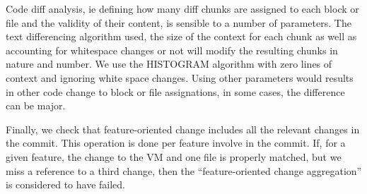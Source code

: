 Code diff analysis, ie defining how many diff chunks are assigned to each block or file and the validity of their content,
is sensible to a number of parameters. The text differencing algorithm used, the size of the context for each chunk as well as 
accounting for whitespace changes or not will modify the resulting chunks in nature and number. 
We use the HISTOGRAM algorithm with zero lines of context and ignoring white space changes. Using other parameters
would results in other code change to block or file assignations, in some cases, the difference can be major.


Finally, we check that feature-oriented change includes all the relevant changes in the commit. This operation is done per feature involve in the commit.
If, for a given feature, the change to the VM and one file is properly matched, but we miss a reference to a third change, then the ``feature-oriented change aggregation'' is considered to have failed.
